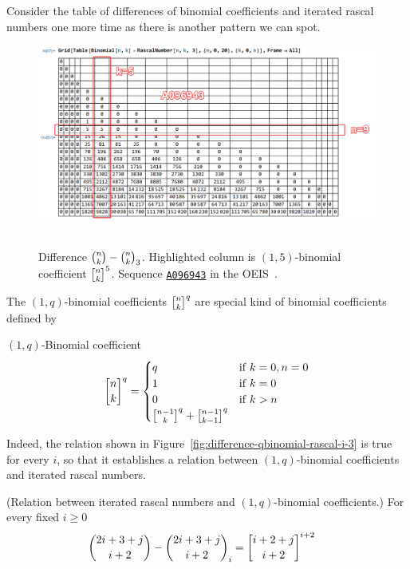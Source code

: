 ﻿Consider the table of differences of binomial coefficients and iterated rascal numbers one more time
as there is another pattern we can spot.
\begin{figure}[H]
    \centering
    \includegraphics[width=1\textwidth]{../img/03_Difference_Binomial_Rascal_i_3_OneQBinomialCoefficients}
    ~\caption{Difference $\binom{n}{k}-\binom{n}{k}_{3}$.
    Highlighted column is $(1,5)$-binomial coefficient $\oneQBinomial{n}{k}{5}$.
    Sequence \href{https://oeis.org/A096943}{\texttt{A096943}} in the OEIS~\cite{sloane2004sixth}.}
    \label{fig:difference-qbinomial-rascal-i-3}
\end{figure}
The $(1,q)$-binomial coefficients $\oneQBinomial{n}{k}{q}$ are special kind of binomial coefficients defined by
\begin{definition}
    $(1,q)$-Binomial coefficient
    \begin{equation}
        \oneQBinomial{n}{k}{q} =
        \begin{cases}
            q & \mathrm{if} \; k=0, n=0 \\
            1 & \mathrm{if} \; k=0 \\
            0 & \mathrm{if} \; k > n \\
            \oneQBinomial{n-1}{k}{q} + \oneQBinomial{n-1}{k-1}{q}
        \end{cases}\label{eq:qbinomial-definition}
    \end{equation}
\end{definition}
Indeed, the relation shown in Figure~\eqref{fig:difference-qbinomial-rascal-i-3} is true for every $i$,
so that it establishes a relation between $(1,q)$-binomial coefficients and iterated rascal numbers.
\begin{proposition} (Relation between iterated rascal numbers and $(1,q)$-binomial coefficients.)
    For every fixed $i\geq0$
    \label{prop:row-column-difference-qbinomial}
    \begin{align*}
        \binom{2i+3+j}{i+2} - \rascalNumber{2i+3+j}{i+2}{i} &= \oneQBinomial{i+2+j}{i+2}{i+2}
    \end{align*}
\end{proposition}
